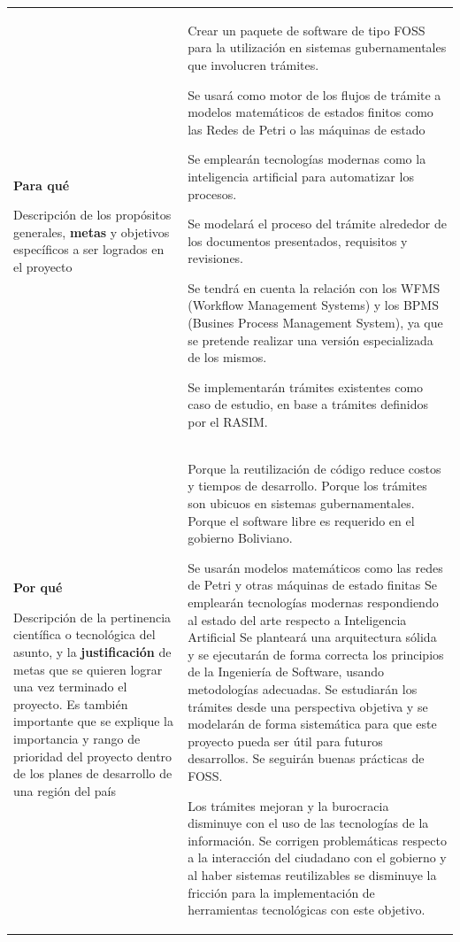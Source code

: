 \begin{longtable}[c]{p{}p{}}
    \textbf{Para qué}

    {\tiny Descripción de los propósitos generales, \textbf{metas} y objetivos específicos a ser logrados en el proyecto} &

    Crear un paquete de software de tipo FOSS para la utilización en sistemas gubernamentales que involucren trámites. 
    
    Se usará como motor de los flujos de trámite a modelos matemáticos de estados finitos como las Redes de Petri o las máquinas de estado
    
    Se emplearán tecnologías modernas como la inteligencia artificial para automatizar los procesos.

    Se modelará el proceso del trámite alrededor de los documentos presentados, requisitos y revisiones.

    Se tendrá en cuenta la relación con los WFMS (Workflow Management Systems) y los BPMS (Busines Process Management System), ya que se pretende realizar una versión especializada de los mismos.

    Se implementarán trámites existentes como caso de estudio, en base a trámites definidos por el RASIM.\\

    \textbf{Por qué}

    {\tiny Descripción de la pertinencia científica o tecnológica del asunto, y la \textbf{justificación} de metas que se quieren lograr una vez terminado el proyecto. Es también importante que se explique la importancia y rango de prioridad del proyecto dentro de los planes de desarrollo de una región del país} &

    Porque la reutilización de código reduce costos y tiempos de desarrollo.
    Porque los trámites son ubicuos en sistemas gubernamentales.
    Porque el software libre es requerido en el gobierno Boliviano.

    
    Se usarán modelos matemáticos como las redes de Petri y otras máquinas de estado finitas
    Se emplearán tecnologías modernas respondiendo al estado del arte respecto a Inteligencia Artificial
    Se planteará una arquitectura sólida y se ejecutarán de forma correcta los principios de la Ingeniería de Software, usando metodologías adecuadas.
    Se estudiarán los trámites desde una perspectiva objetiva y se modelarán de forma sistemática para que este proyecto pueda ser útil para futuros desarrollos.
    Se seguirán buenas prácticas de FOSS.

    Los trámites mejoran y la burocracia disminuye con el uso de las tecnologías de la información. Se corrigen problemáticas respecto a la interacción del ciudadano con el gobierno y al haber sistemas reutilizables se disminuye la fricción para la implementación de herramientas tecnológicas con este objetivo.
    \\


\end{longtable}
